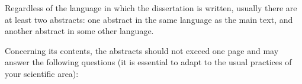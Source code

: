 ﻿%

%

Regardless of the language in which the dissertation is written, usually there are at least two abstracts: one abstract in the same language as the main text, and another abstract in some other language.
 


Concerning its contents, the abstracts should not exceed one page and may answer the following questions (it is essential to adapt to the usual practices of your scientific area):



